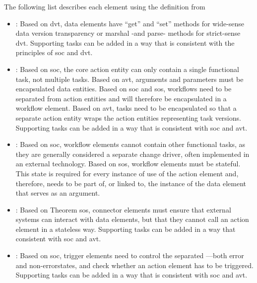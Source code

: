 The following list describes each element using the definition from
\textcite[102]{mannaert_towards_2012}
\begin{itemize}
    \item {}: Based on \gls{dvt}, data elements have \enquote{get}
    and \enquote{set} methods for wide-sense data version transparency or marshal -and
    parse- methods for strict-sense \gls{dvt}. Supporting tasks can be added in a way
    that is consistent with the principles of \gls{soc} and \gls{dvt}.
    \item {}: Based on \gls{soc}, the core action entity can only
    contain a single functional task, not multiple tasks. Based on \gls{avt},
    arguments and parameters must be encapsulated data entities. Based on \gls{soc} and
    \gls{sos}, workflows need to be separated from action entities and will therefore be
    encapsulated in a workflow element. Based on \gls{avt}, tasks need to be encapsulated
    so that a separate action entity wraps the action entities representing task versions.
    Supporting tasks can be added in a way that is consistent with \gls{soc} and
    \gls{avt}.
    \item {}: Based on \gls{soc}, workflow elements cannot
    contain other functional tasks, as they are generally considered a separate change
    driver, often implemented in an external technology. Based on \gls{sos}, workflow
    elements must be stateful. This state is required for every instance of use of the
    action element and, therefore, needs to be part of, or linked to, the instance of the
    data element that serves as an argument.
    \item {}: Based on Theorem \gls{sos}, connector elements must
    ensure that external systems can interact with data elements, but that they cannot
    call an action element in a stateless way. Supporting tasks can be added in a way that
    consistent with \gls{soc} and \gls{avt}.
    \item {}: Based on \gls{soc}, trigger elements need to
    control the separated —both error and non-errorstates, and check whether an action
    element has to be triggered. Supporting tasks can be added in a way that is consistent
    with \gls{soc} and \gls{avt}.
\end{itemize}